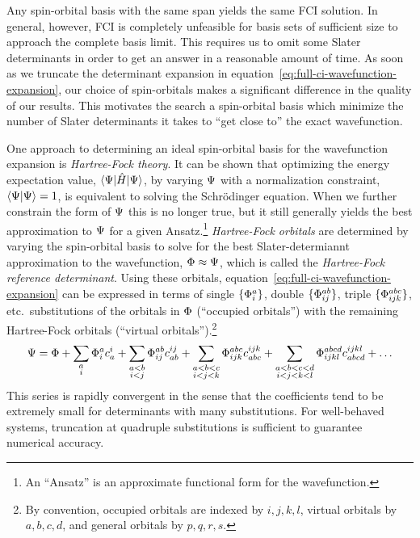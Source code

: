 \documentclass[11pt]{article}
\numberwithin{equation}{section}
\begin{document}
Any spin-orbital basis with the same span yields the same FCI solution.
In general, however, FCI is completely unfeasible for basis sets of sufficient size to approach the complete basis limit.
This requires us to omit some Slater determinants in order to get an answer in a reasonable amount of time.
As soon as we truncate the determinant expansion in equation~\ref{eq:full-ci-wavefunction-expansion}, our choice of spin-orbitals makes a significant difference in the quality of our results.
This motivates the search a spin-orbital basis which minimize the number of Slater determinants it takes to ``get close to'' the exact wavefunction.

One approach to determining an ideal spin-orbital basis for the wavefunction expansion is \textit{Hartree-Fock theory}.
It can be shown that optimizing the energy expectation value, $\langle\Psi |\hat{H}|\Psi \rangle$, by varying $\Psi $ with a normalization constraint, $\langle\Psi |\Psi \rangle=1$, is equivalent to solving the Schr\"odinger equation.
When we further constrain the form of $\Psi $ this is no longer true, but it still generally yields the best approximation to $\Psi $ for a given Ansatz.\footnote{An ``Ansatz'' is an approximate functional form for the wavefunction.}
\textit{Hartree-Fock orbitals} are determined by varying the spin-orbital basis to solve for the best Slater-determiannt approximation to the wavefunction, $\Phi \approx \Psi $, which is called the \textit{Hartree-Fock reference determinant}.
Using these orbitals, equation~\ref{eq:full-ci-wavefunction-expansion} can be expressed in terms of single $\{\Phi _i^a\}$, double $\{\Phi _{ij}^{ab}\}$, triple $\{\Phi _{ijk}^{abc}\}$, etc.\ substitutions of the orbitals in $\Phi $ (``occupied orbitals'') with the remaining Hartree-Fock orbitals (``virtual orbitals'').\footnote{By convention, occupied orbitals are indexed by $i,j,k,l$, virtual orbitals by $a,b,c,d$, and general orbitals by $p,q,r,s$.}
\begin{align}
  \Psi 
=
  \Phi 
+
  \sum_{\substack{a\\i}}
  \Phi _i^ac_a^i
+
  \sum_{\substack{a<b\\i<j}}
  \Phi _{ij}^{ab}c_{ab}^{ij}
+
  \sum_{\substack{a<b<c\\i<j<k}}
  \Phi _{ijk}^{abc}c_{abc}^{ijk}
+
  \sum_{\substack{a<b<c<d\\i<j<k<l}}
  \Phi _{ijkl}^{abcd}c_{abcd}^{ijkl}
+\ldots
\end{align}
This series is rapidly convergent in the sense that the coefficients tend to be extremely small for determinants with many substitutions.
For well-behaved systems, truncation at quadruple substitutions is sufficient to guarantee numerical accuracy.
\end{document}
